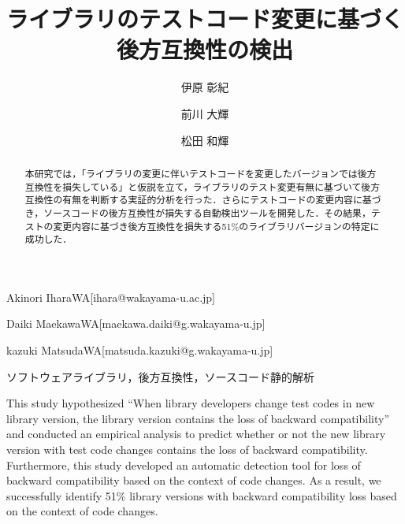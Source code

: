 \documentclass[submit]{ipsj}
\begin{document}
\title{ライブラリのテストコード変更に基づく\\後方互換性の検出}





\author{伊原 彰紀}{Akinori Ihara}{WA}[ihara@wakayama-u.ac.jp]
\author{前川 大輝}{Daiki Maekawa}{WA}[maekawa.daiki@g.wakayama-u.jp]
\author{松田 和輝}{kazuki Matsuda}{WA}[matsuda.kazuki@g.wakayama-u.jp]

\begin{abstract}
本研究では，「ライブラリの変更に伴いテストコードを変更したバージョンでは後方互換性を損失している」と仮説を立て，ライブラリのテスト変更有無に基づいて後方互換性の有無を判断する実証的分析を行った．さらにテストコードの変更内容に基づき，ソースコードの後方互換性が損失する自動検出ツールを開発した．その結果，テストの変更内容に基づき後方互換性を損失する51\%のライブラリバージョンの特定に成功した．
\end{abstract}


\begin{jkeyword}
ソフトウェアライブラリ，後方互換性，ソースコード静的解析
\end{jkeyword}

\begin{eabstract}
This study hypothesized ``When library developers change test codes in new library version, the library version contains the loss of backward compatibility'' and conducted an empirical analysis to predict whether or not the new library version with test code changes contains the loss of backward compatibility. Furthermore, this study developed an automatic detection tool for loss of backward compatibility based on the context of code changes. As a result, we successfully identify 51\% library versions with backward compatibility loss based on the context of code changes.
\end{eabstract}
\end{document}
